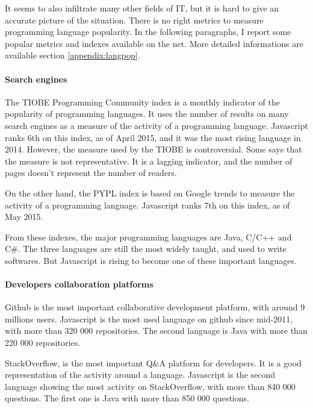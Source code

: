 It seems to also infiltrate many other fields of IT, but it is hard to give an accurate picture of the situation.
There is no right metrics to measure programming language popularity.
In the following paragraphs, I report some popular metrics and indexes available on the net.
More detailed informations are available section \ref{appendix:langpop}.

\paragraph{Search engines}

The TIOBE Programming Community index is a monthly indicator of the popularity of programming languages.
It uses the number of results on many search engines as a measure of the activity of a programming language.
Javascript ranks 6th on this index, as of April 2015, and it was the most rising language in 2014.
However, the measure used by the TIOBE is controversial.
Some says that the measure is not representative.
It is a lagging indicator, and the number of pages doesn't represent the number of readers.

On the other hand, the PYPL index is based on Google trends to measure the activity of a programming language.
Javascript ranks 7th on this index, as of May 2015.

From these indexes, the major programming languages are Java, C/C++ and C\#.
The three languages are still the most widely taught, and used to write softwares.
But Javascript is rising to become one of these important languages.

\paragraph{Developers collaboration platforms}

Github is the most important collaborative development platform, with around 9 millions users.
Javascript is the most used language on github since mid-2011, with more than 320 000 repositories.
The second language is Java with more than 220 000 repositories.


StackOverflow, is the most important Q\&A platform for developers.
It is a good representation of the activity around a language.
Javascript is the second language showing the most activity on StackOverflow, with more than 840 000 questions.
The first one is Java with more than 850 000 questions.

